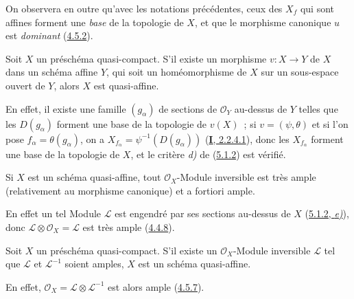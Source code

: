 On observera en outre qu'avec les notations précédentes, ceux des $X_f$ qui
sont affines forment une \emph{base} de la topologie de $X$, et que le
morphisme canonique $u$ est \emph{dominant}
(\hyperref[II.4.5.2-fr]{4.5.2}).

\begin{corollary}[5.1.3]
\label{II.5.1.3-fr}
Soit $X$ un préschéma quasi-compact. S'il existe un morphisme $v:X\to Y$ de
$X$ dans un schéma affine $Y$, qui soit un homéomorphisme de $X$ sur un
sous-espace ouvert de $Y$, alors $X$ est quasi-affine.
\end{corollary}

En effet, il existe une famille $(g_\alpha)$ de sections de $\mathcal{O}_Y$
au-dessus de $Y$ telles que les $D(g_\alpha)$ forment une base de la
topologie de $v(X)$~; si $v=(\psi,\theta)$ et si l'on pose
$f_\alpha=\theta(g_\alpha)$, on a
$X_{f_\alpha}=\psi^{-1}(D(g_\alpha))$
(\hyperref[I.2.2.4.1-fr]{\textbf{I}, 2.2.4.1}), donc les $X_{f_\alpha}$ forment une
base de la topologie de $X$, et le critère \emph{d)} de
(\hyperref[II.5.1.2-fr]{5.1.2}) est vérifié.

\begin{corollary}[5.1.4]
\label{II.5.1.4-fr}
Si $X$ est un schéma quasi-affine, \textup{tout} $\mathcal{O}_X$-Module inversible est
très ample (relativement au morphisme canonique) et \textup{a fortiori} ample.
\end{corollary}

En effet un tel Module $\mathcal{L}$ est engendré par ses sections au-dessus
de $X$ (\hyperref[II.5.1.2-fr]{5.1.2, \emph{e)}}), donc
$\mathcal{L}\otimes\mathcal{O}_X=\mathcal{L}$ est très ample
(\hyperref[II.4.4.8-fr]{4.4.8}).

\begin{corollary}[5.1.5]
\label{II.5.1.5-fr}
Soit $X$ un préschéma quasi-compact. S'il existe un $\mathcal{O}_X$-Module
inversible $\mathcal{L}$ tel que $\mathcal{L}$ et $\mathcal{L}^{-1}$ soient
amples, $X$ est un schéma quasi-affine.
\end{corollary}

En effet, $\mathcal{O}_X=\mathcal{L}\otimes\mathcal{L}^{-1}$ est alors ample
(\hyperref[II.4.5.7-fr]{4.5.7}).

